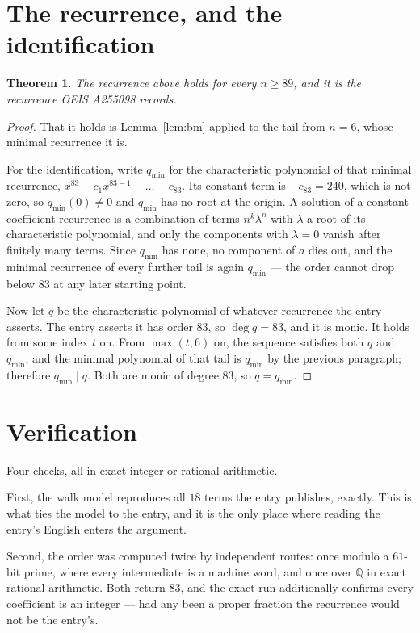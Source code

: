 \documentclass[11pt,a4paper]{article}
\theoremstyle{plain}
\newtheorem{theorem}{Theorem}
\theoremstyle{definition}
\begin{document}
\section{The recurrence, and the identification}

\begin{theorem}
The recurrence above holds for every $n\ge89$, and it is the recurrence OEIS A255098 records.
\end{theorem}

\begin{proof}
That it holds is Lemma~\ref{lem:bm} applied to the tail from $n=6$, whose minimal
recurrence it is.

For the identification, write $q_{\min}$ for the characteristic polynomial of that minimal
recurrence, $x^{83}-c_1x^{83-1}-\dots-c_{83}$. Its constant term is
$-c_{83}=240$, which is not zero, so $q_{\min}(0)\neq0$ and $q_{\min}$ has no
root at the origin. A solution of a constant-coefficient recurrence is a combination of terms
$n^{k}\lambda^{n}$ with $\lambda$ a root of its characteristic polynomial, and only the
components with $\lambda=0$ vanish after finitely many terms. Since $q_{\min}$ has none, no
component of $a$ dies out, and the minimal recurrence of every further tail is again
$q_{\min}$ --- the order cannot drop below $83$ at any later starting point.

Now let $q$ be the characteristic polynomial of whatever recurrence the entry asserts. The
entry asserts it has order $83$, so $\deg q=83$, and it is monic. It holds from some
index $t$ on. From $\max(t,6)$ on, the sequence satisfies both $q$ and $q_{\min}$, and
the minimal polynomial of that tail is $q_{\min}$ by the previous paragraph; therefore
$q_{\min}\mid q$. Both are monic of degree $83$, so $q=q_{\min}$.
\end{proof}

\section{Verification}

Four checks, all in exact integer or rational arithmetic.

First, the walk model reproduces all $18$ terms the entry publishes, exactly. This is
what ties the model to the entry, and it is the only place where reading the entry's English
enters the argument.

Second, the order was computed twice by independent routes: once modulo a $61$-bit prime, where
every intermediate is a machine word, and once over $\mathbb{Q}$ in exact rational arithmetic.
Both return $83$, and the exact run additionally confirms every coefficient is an integer
--- had any been a proper fraction the recurrence would not be the entry's.
\end{document}
